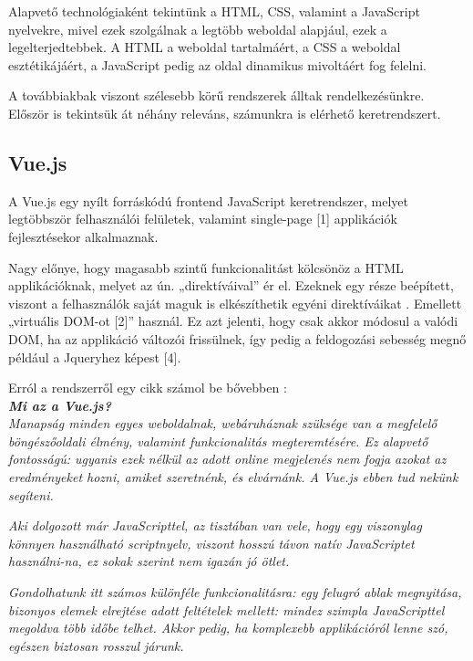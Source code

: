 
Alapvető technológiaként tekintünk a HTML, CSS, valamint a JavaScript nyelvekre, mivel ezek szolgálnak a legtöbb weboldal alapjául, ezek a legelterjedtebbek. A HTML a weboldal tartalmáért, a CSS a weboldal esztétikájáért, a JavaScript pedig az oldal dinamikus mivoltáért fog felelni.

A továbbiakbak viszont szélesebb körű rendszerek álltak rendelkezésünkre. Először is tekintsük át néhány releváns, számunkra is elérhető keretrendszert.



\subsection{Vue.js}

A Vue.js egy nyílt forráskódú frontend JavaScript keretrendszer, melyet legtöbbször felhasználói felületek, valamint single-page [1] applikációk fejlesztésekor alkalmaznak.

Nagy előnye, hogy magasabb szintű funkcionalitást kölcsönöz a HTML applikációknak, melyet az ún. „direktíváival” ér el. Ezeknek egy része beépített, viszont a felhasználók saját maguk is elkészíthetik egyéni direktíváikat \cite{w3schoolsvue}. Emellett „virtuális DOM-ot [2]” használ. Ez azt jelenti, hogy csak akkor módosul a valódi DOM, ha az applikáció változói frissülnek, így pedig a feldogozási sebesség megnő például a Jqueryhez képest [4].

Erról a rendszerről egy cikk számol be bővebben \cite{vuecikk}:\\

\noindent\textit{\textbf{\large{Mi az a Vue.js?}}}\\

\textit{Manapság minden egyes weboldalnak, webáruháznak szüksége van a megfelelő böngészőoldali élmény, valamint funkcionalitás megteremtésére. Ez alapvető fontosságú: ugyanis ezek nélkül az adott online megjelenés nem fogja azokat az eredményeket hozni, amiket szeretnénk, és elvárnánk. A Vue.js ebben tud nekünk segíteni.}

\textit{Aki dolgozott már JavaScripttel, az tisztában van vele, hogy egy viszonylag könnyen használható scriptnyelv, viszont hosszú távon natív JavaScriptet használni-na, ez sokak szerint nem igazán jó ötlet.}

\textit{Gondolhatunk itt számos különféle funkcionalitásra: egy felugró ablak megnyitása, bizonyos elemek elrejtése adott feltételek mellett: mindez szimpla JavaScripttel megoldva több időbe telhet. Akkor pedig, ha komplexebb applikációról lenne szó, egészen biztosan rosszul járunk.}

